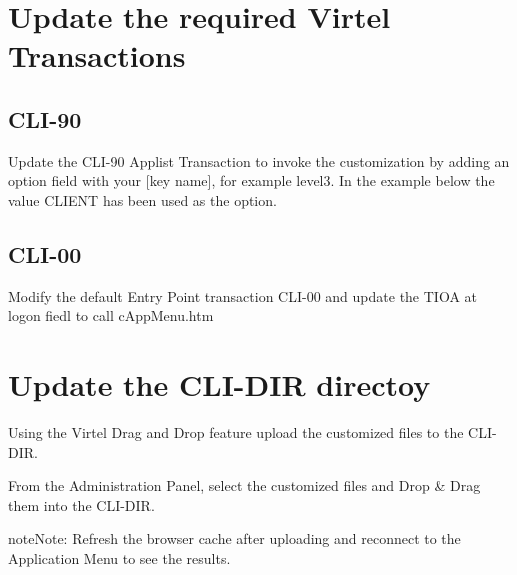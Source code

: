 \documentclass[letterpaper,10pt,english]{sphinxmanual}
\begin{document}


\section{Update the required Virtel Transactions}
\label{\detokenize{Customization:update-the-required-virtel-transactions}}

\subsection{CLI-90}
\label{\detokenize{Customization:cli-90}}
Update the CLI-90 Applist Transaction to invoke the customization by adding an option field with your {[}key name{]}, for example level3. In the example below the value CLIENT has been used as the option.



\subsection{CLI-00}
\label{\detokenize{Customization:cli-00}}
Modify the default Entry Point transaction CLI-00 and update the TIOA at logon fiedl to call cAppMenu.htm



\section{Update the CLI-DIR directoy}
\label{\detokenize{Customization:update-the-cli-dir-directoy}}
Using the Virtel Drag and Drop feature upload the customized files to the CLI-DIR.


From the Administration Panel, select the customized files and Drop \& Drag them into the CLI-DIR.


\begin{sphinxadmonition}{note}{Note:}
Refresh the browser cache after uploading and reconnect to the Application Menu to see the results.
\end{sphinxadmonition}
\end{document}
